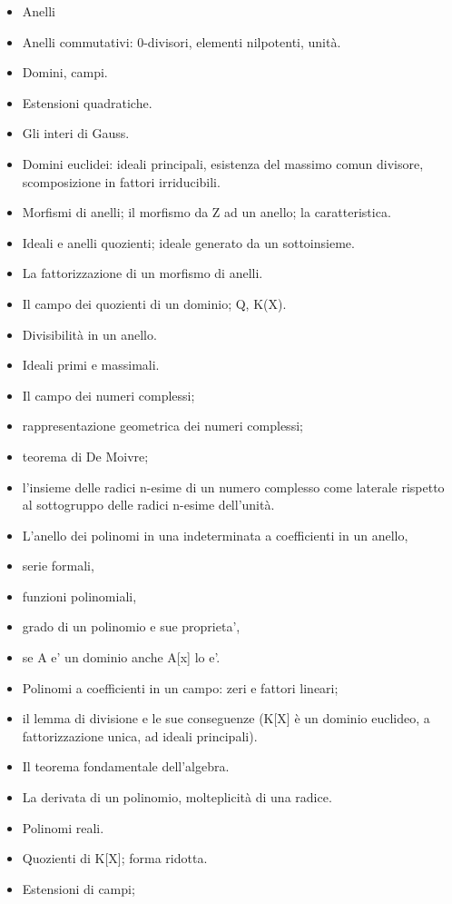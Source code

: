 \documentclass[a4paper,10pt]{article}
\begin{document}
\begin{itemize}
 \item Anelli
 \item Anelli commutativi: 0-divisori, elementi nilpotenti, unità.
 \item Domini, campi. 
 \item Estensioni quadratiche. 
 \item Gli interi di Gauss. 
 \item Domini euclidei:  ideali principali, esistenza del massimo comun divisore, scomposizione in fattori irriducibili. 
 \item Morfismi di anelli; il morfismo da Z ad un anello; la caratteristica. 
 \item Ideali e anelli quozienti; ideale generato da un sottoinsieme. 
 \item La fattorizzazione di un morfismo di anelli. 
 \item Il campo dei quozienti di un dominio; Q, K(X). 
 \item Divisibilità in un anello. 
 \item Ideali primi e massimali.
 \item Il campo dei numeri complessi;
 \item rappresentazione geometrica dei numeri complessi; 
 \item teorema di De Moivre; 
 \item l'insieme delle radici n-esime di un numero complesso come laterale rispetto al sottogruppo delle radici n-esime dell'unità.
 \item L'anello dei polinomi in una indeterminata a coefficienti in un anello, 
 \item serie formali, 
 \item funzioni polinomiali, 
 \item grado di un polinomio e sue proprieta', 
 \item se A e' un dominio anche A[x] lo e'. 
 \item Polinomi a coefficienti in un campo: zeri e fattori lineari; 
 \item il lemma di divisione e le sue conseguenze (K[X] è un dominio euclideo, a fattorizzazione unica, ad ideali principali). 
 \item Il teorema fondamentale dell'algebra. 
 \item La derivata di un polinomio, molteplicità di una radice. 
 \item Polinomi reali.
 \item Quozienti di K[X]; forma ridotta. 
 \item Estensioni di campi; 

\end{itemize}
\end{document}
